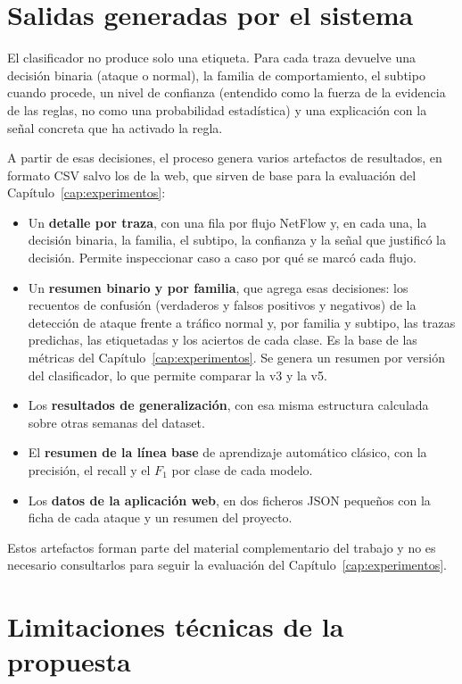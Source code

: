 \section{Salidas generadas por el sistema}
\label{sec:alg_salidas}

El clasificador no produce solo una etiqueta. Para cada traza devuelve una decisión binaria (ataque o normal), la familia de comportamiento, el subtipo cuando procede, un nivel de confianza (entendido como la fuerza de la evidencia de las reglas, no como una probabilidad estadística) y una explicación con la señal concreta que ha activado la regla.

A partir de esas decisiones, el proceso genera varios artefactos de resultados, en formato CSV salvo los de la web, que sirven de base para la evaluación del Capítulo~\ref{cap:experimentos}:

\begin{itemize}
  \item Un \textbf{detalle por traza}, con una fila por flujo NetFlow y, en cada una, la decisión binaria, la familia, el subtipo, la confianza y la señal que justificó la decisión. Permite inspeccionar caso a caso por qué se marcó cada flujo.
  \item Un \textbf{resumen binario y por familia}, que agrega esas decisiones: los recuentos de confusión (verdaderos y falsos positivos y negativos) de la detección de ataque frente a tráfico normal y, por familia y subtipo, las trazas predichas, las etiquetadas y los aciertos de cada clase. Es la base de las métricas del Capítulo~\ref{cap:experimentos}. Se genera un resumen por versión del clasificador, lo que permite comparar la v3 y la v5.
  \item Los \textbf{resultados de generalización}, con esa misma estructura calculada sobre otras semanas del dataset.
  \item El \textbf{resumen de la línea base} de aprendizaje automático clásico, con la precisión, el recall y el $F_1$ por clase de cada modelo.
  \item Los \textbf{datos de la aplicación web}, en dos ficheros JSON pequeños con la ficha de cada ataque y un resumen del proyecto.
\end{itemize}

Estos artefactos forman parte del material complementario del trabajo y no es necesario consultarlos para seguir la evaluación del Capítulo~\ref{cap:experimentos}.

\section{Limitaciones técnicas de la propuesta}
\label{sec:alg_limitaciones}

